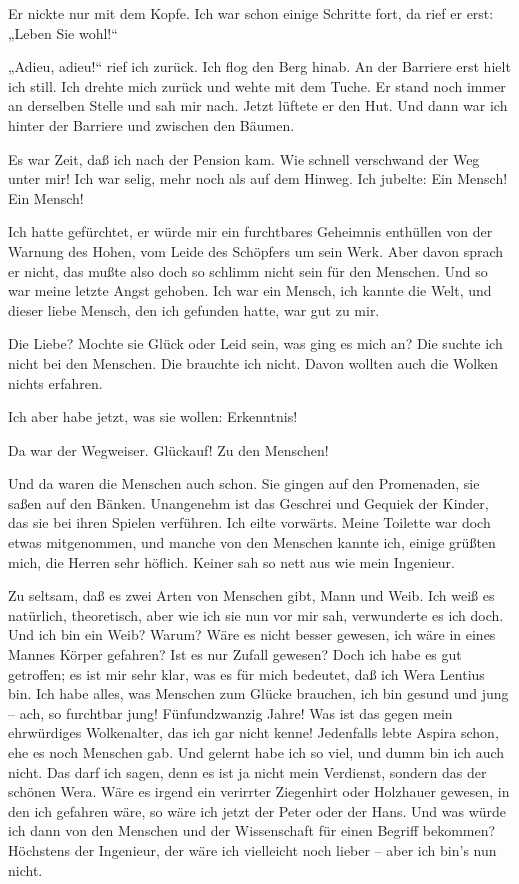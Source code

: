 Er nickte nur mit dem Kopfe. Ich war schon einige Schritte fort, da
rief er erst: „Leben Sie wohl!“

„Adieu, adieu!“ rief ich zurück. Ich flog den Berg hinab. An der
Barriere erst hielt ich still. Ich drehte mich zurück und wehte mit
dem Tuche. Er stand noch immer an derselben Stelle und sah mir
nach. Jetzt lüftete er den Hut. Und dann war ich hinter der
Barriere und zwischen den Bäumen.

Es war Zeit, daß ich nach der Pension kam. Wie schnell verschwand
der Weg unter mir! Ich war selig, mehr noch als auf dem Hinweg. Ich
jubelte: Ein Mensch! Ein Mensch!

Ich hatte gefürchtet, er würde mir ein furchtbares Geheimnis
enthüllen von der Warnung des Hohen, vom Leide des Schöpfers um
sein Werk. Aber davon sprach er nicht, das mußte also doch so
schlimm nicht sein für den Menschen. Und so war meine letzte Angst
gehoben. Ich war ein Mensch, ich kannte die Welt, und dieser liebe
Mensch, den ich gefunden hatte, war gut zu mir.

Die Liebe? Mochte sie Glück oder Leid sein, was ging es mich an?
Die suchte ich nicht bei den Menschen. Die brauchte ich nicht.
Davon wollten auch die Wolken nichts erfahren.

Ich aber habe jetzt, was sie wollen: Erkenntnis!

Da war der Wegweiser. Glückauf! Zu den Menschen!

Und da waren die Menschen auch schon. Sie gingen auf den
Promenaden, sie saßen auf den Bänken. Unangenehm ist das Geschrei
und Gequiek der Kinder, das sie bei ihren Spielen verführen. Ich
eilte vorwärts. Meine Toilette war doch etwas mitgenommen, und
manche von den Menschen kannte ich, einige grüßten mich, die Herren
sehr höflich. Keiner sah so nett aus wie mein Ingenieur.

Zu seltsam, daß es zwei Arten von Menschen gibt, Mann und Weib. Ich
weiß es natürlich, theoretisch, aber wie ich sie nun vor mir sah,
verwunderte es ich doch. Und ich bin ein Weib? Warum? Wäre es nicht
besser gewesen, ich wäre in eines Mannes Körper gefahren? Ist es
nur Zufall gewesen? Doch ich habe es gut getroffen; es ist mir sehr
klar, was es für mich bedeutet, daß ich Wera Lentius bin. Ich habe
alles, was Menschen zum Glücke brauchen, ich bin gesund und jung –
ach, so furchtbar jung! Fünfundzwanzig Jahre! Was ist das gegen
mein ehrwürdiges Wolkenalter, das ich gar nicht kenne! Jedenfalls
lebte Aspira schon, ehe es noch Menschen gab. Und gelernt habe ich
so viel, und dumm bin ich auch nicht. Das darf ich sagen, denn es
ist ja nicht mein Verdienst, sondern das der schönen Wera. Wäre es
irgend ein verirrter Ziegenhirt oder Holzhauer gewesen, in den ich
gefahren wäre, so wäre ich jetzt der Peter oder der Hans. Und was
würde ich dann von den Menschen und der Wissenschaft für einen
Begriff bekommen? Höchstens der Ingenieur, der wäre ich vielleicht
noch lieber – aber ich bin's nun nicht.

